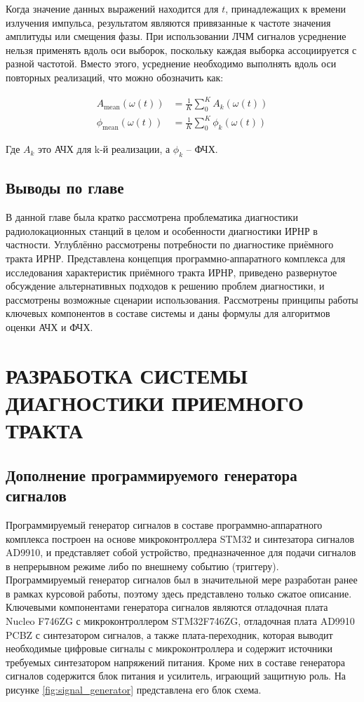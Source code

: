 \documentclass{report}
\begin{document}
Когда значение данных выражений находится для $t$, принадлежащих к времени излучения импульса, результатом являются привязанные к частоте значения амплитуды или смещения фазы. При использовании ЛЧМ сигналов усреднение нельзя применять вдоль оси выборок, поскольку каждая выборка ассоциируется с разной частотой. Вместо этого, усреднение необходимо выполнять вдоль оси повторных реализаций, что можно обозначить как:

\begin{align}
A_\text{mean}(\omega(t)) &= \frac{1}{K} \sum_{0}^{K} A_k(\omega(t)) \\
\phi_\text{mean}(\omega(t)) &= \frac{1}{K} \sum_{0}^{K} \phi_k(\omega(t))
\end{align}

Где $A_k$ это АЧХ для k-й реализации, а $\phi_k$ -- ФЧХ.

\section*{Выводы по главе}

В данной главе была кратко рассмотрена проблематика диагностики радиолокационных станций в целом и особенности диагностики ИРНР в частности. Углублённо рассмотрены потребности по диагностике приёмного тракта ИРНР. Представлена концепция программно-аппаратного комплекса для исследования характеристик приёмного тракта ИРНР, приведено развернутое обсуждение альтернативных подходов к решению проблем диагностики, и рассмотрены возможные сценарии использования. Рассмотрены принципы работы ключевых компонентов в составе системы и даны формулы для алгоритмов оценки АЧХ и ФЧХ.

\chapter{РАЗРАБОТКА СИСТЕМЫ ДИАГНОСТИКИ ПРИЕМНОГО ТРАКТА}
\setcounter{section}{0}
\setcounter{subsection}{0}
\setcounter{equation}{0}
\section{Дополнение программируемого генератора сигналов}

Программируемый генератор сигналов в составе программно-аппаратного комплекса построен на основе микроконтроллера STM32 и синтезатора сигналов AD9910, и представляет собой устройство, предназначенное для подачи сигналов в непрерывном режиме либо по внешнему событию (триггеру). Программируемый генератор сигналов был в значительной мере разработан ранее в рамках курсовой работы, поэтому здесь представлено только сжатое описание. Ключевыми компонентами генератора сигналов являются отладочная плата Nucleo F746ZG с микроконтроллером STM32F746ZG, отладочная плата AD9910 PCBZ с синтезатором сигналов, а также плата-переходник, которая выводит необходимые цифровые сигналы с микроконтроллера и содержит источники требуемых синтезатором напряжений питания. Кроме них в составе генератора сигналов содержится блок питания и усилитель, играющий защитную роль. На рисунке \ref{fig:signal_generator} представлена его блок схема.
\end{document}

